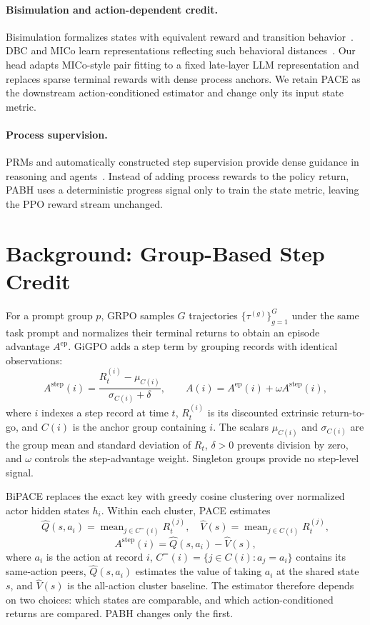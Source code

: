 \documentclass[10pt,twocolumn,letterpaper]{article}
\newcommand{\method}{PABH\xspace}
\newcommand{\Aepisode}{A^{\mathrm{ep}}}
\newcommand{\Astep}{A^{\mathrm{step}}}
\begin{document}
\paragraph{Bisimulation and action-dependent credit.}
Bisimulation formalizes states with equivalent reward and transition behavior~\cite{givan,ferns}. DBC and MICo learn representations reflecting such behavioral distances~\cite{dbc,mico}. Our head adapts MICo-style pair fitting to a fixed late-layer LLM representation and replaces sparse terminal rewards with dense process anchors. We retain PACE as the downstream action-conditioned estimator and change only its input state metric.

\paragraph{Process supervision.}
PRMs and automatically constructed step supervision provide dense guidance in reasoning and agents~\cite{prm,mathshepherd,pqm,edu_prm,istar,turn_reward}. Instead of adding process rewards to the policy return, \method uses a deterministic progress signal only to train the state metric, leaving the PPO reward stream unchanged.

\section{Background: Group-Based Step Credit}
\label{sec:background}

For a prompt group $p$, GRPO samples $G$ trajectories $\{\tau^{(g)}\}_{g=1}^{G}$ under the same task prompt and normalizes their terminal returns to obtain an episode advantage $\Aepisode$. GiGPO adds a step term by grouping records with identical observations:
\begin{equation}
\Astep(i)=\frac{R_t^{(i)}-\mu_{C(i)}}{\sigma_{C(i)}+\delta},\qquad
A(i)=\Aepisode(i)+\omega\Astep(i),
\end{equation}
where $i$ indexes a step record at time $t$, $R_t^{(i)}$ is its discounted extrinsic return-to-go, and $C(i)$ is the anchor group containing $i$. The scalars $\mu_{C(i)}$ and $\sigma_{C(i)}$ are the group mean and standard deviation of $R_t$, $\delta>0$ prevents division by zero, and $\omega$ controls the step-advantage weight. Singleton groups provide no step-level signal.

BiPACE replaces the exact key with greedy cosine clustering over normalized actor hidden states $h_i$. Within each cluster, PACE estimates
\begin{equation}
\hat Q(s,a_i)=\operatorname{mean}_{j\in C^{=}(i)}R_t^{(j)},\quad
\hat V(s)=\operatorname{mean}_{j\in C(i)}R_t^{(j)},
\end{equation}
\begin{equation}
\Astep(i)=\hat Q(s,a_i)-\hat V(s),
\end{equation}
where $a_i$ is the action at record $i$, $C^{=}(i)=\{j\in C(i):a_j=a_i\}$ contains its same-action peers, $\hat Q(s,a_i)$ estimates the value of taking $a_i$ at the shared state $s$, and $\hat V(s)$ is the all-action cluster baseline. The estimator therefore depends on two choices: which states are comparable, and which action-conditioned returns are compared. \method changes only the first.
\end{document}
